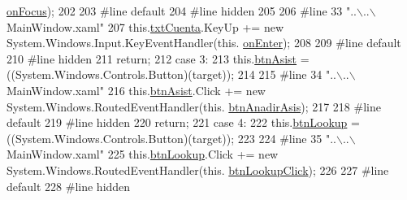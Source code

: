 \begin{DoxyCode}
      \hyperlink{class_asistencias__wpf_1_1_main_window_acb5ec5ec33907eb146447f12fcd18d94}{onFocus});
202             
203 \textcolor{preprocessor}{            #line default}
204 \textcolor{preprocessor}{}\textcolor{preprocessor}{            #line hidden}
205 \textcolor{preprocessor}{}            
206 \textcolor{preprocessor}{            #line 33 "..\(\backslash\)..\(\backslash\)MainWindow.xaml"}
207 \textcolor{preprocessor}{}            this.\hyperlink{class_asistencias__wpf_1_1_main_window_a52e76fc15be974c00138b13ab7e19b44}{txtCuenta}.KeyUp += \textcolor{keyword}{new} System.Windows.Input.KeyEventHandler(this.
      \hyperlink{class_asistencias__wpf_1_1_main_window_af5e3f09d78ecb240a880e737454e1246}{onEnter});
208             
209 \textcolor{preprocessor}{            #line default}
210 \textcolor{preprocessor}{}\textcolor{preprocessor}{            #line hidden}
211 \textcolor{preprocessor}{}            \textcolor{keywordflow}{return};
212             \textcolor{keywordflow}{case} 3:
213             this.\hyperlink{class_asistencias__wpf_1_1_main_window_a65c34d321ad5d831ae14e80205d153b8}{btnAsist} = ((System.Windows.Controls.Button)(target));
214             
215 \textcolor{preprocessor}{            #line 34 "..\(\backslash\)..\(\backslash\)MainWindow.xaml"}
216 \textcolor{preprocessor}{}            this.\hyperlink{class_asistencias__wpf_1_1_main_window_a65c34d321ad5d831ae14e80205d153b8}{btnAsist}.Click += \textcolor{keyword}{new} System.Windows.RoutedEventHandler(this.
      \hyperlink{class_asistencias__wpf_1_1_main_window_ae82807e4848c98f05418df82f3da7159}{btnAnadirAsis});
217             
218 \textcolor{preprocessor}{            #line default}
219 \textcolor{preprocessor}{}\textcolor{preprocessor}{            #line hidden}
220 \textcolor{preprocessor}{}            \textcolor{keywordflow}{return};
221             \textcolor{keywordflow}{case} 4:
222             this.\hyperlink{class_asistencias__wpf_1_1_main_window_a06d0d015783f1332649608fd2a84d459}{btnLookup} = ((System.Windows.Controls.Button)(target));
223             
224 \textcolor{preprocessor}{            #line 35 "..\(\backslash\)..\(\backslash\)MainWindow.xaml"}
225 \textcolor{preprocessor}{}            this.\hyperlink{class_asistencias__wpf_1_1_main_window_a06d0d015783f1332649608fd2a84d459}{btnLookup}.Click += \textcolor{keyword}{new} System.Windows.RoutedEventHandler(this.
      \hyperlink{class_asistencias__wpf_1_1_main_window_a0e869f220f887ff19bf34d09aee597c1}{btnLookupClick});
226             
227 \textcolor{preprocessor}{            #line default}
228 \textcolor{preprocessor}{}\textcolor{preprocessor}{            #line hidden}

\end{DoxyCode}
